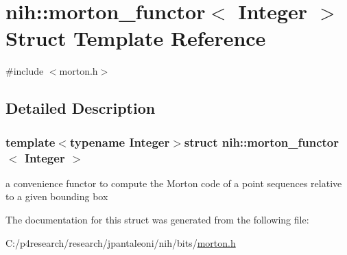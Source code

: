 \hypertarget{structnih_1_1morton__functor}{
\section{nih\-:\-:morton\-\_\-functor$<$ \-Integer $>$ \-Struct \-Template \-Reference}
\label{structnih_1_1morton__functor}
}


{\ttfamily \#include $<$morton.\-h$>$}



\subsection{\-Detailed \-Description}
\subsubsection*{template$<$typename Integer$>$struct nih\-::morton\-\_\-functor$<$ Integer $>$}

a convenience functor to compute the \-Morton code of a point sequences relative to a given bounding box 

\-The documentation for this struct was generated from the following file\-:\begin{DoxyCompactItemize}
\item 
\-C\-:/p4research/research/jpantaleoni/nih/bits/\hyperlink{morton_8h}{morton.\-h}\end{DoxyCompactItemize}
